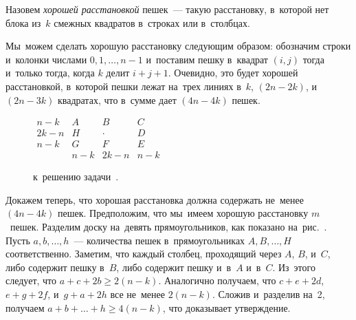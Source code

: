 \ifincludesolutions
Назовем \emph{хорошей расстановкой} пешек~--- такую расстановку, в~которой нет
блока из~$k$ смежных квадратов в~строках или в~столбцах.
\par
Мы~можем сделать хорошую расстановку следующим образом: обозначим строки
и~колонки числами $0, 1, \ldots, n - 1$ и~поставим пешку в~квадрат $(i, j)$
тогда и~только тогда, когда $k$ делит $i + j + 1$.
Очевидно, это будет хорошей расстановкой, в~которой пешки лежат на~трех линиях
в~$k$, $(2 n - 2 k)$, и~$(2 n - 3 k)$ квадратах, что в~сумме дает
$(4 n - 4 k)$ пешек.
\par
\begin{figure}[ht]\begin{center}
\(\begin{matrix}
    n - k    &    A    &     B     &    C    \\[2ex]
    2 k - n  &    H    &   \cdot   &    D    \\[2ex]
    n - k    &    G    &     F     &    E    \\[2ex]
             &  n - k  &  2 k - n  &  n - k
\end{matrix}\)
\caption{к~решению
    задачи~.}%
\end{center}\end{figure}
Докажем теперь, что хорошая расстановка должна содержать не~менее
$(4 n - 4 k)$ пешек.
Предположим, что мы~имеем хорошую расстановку $m$~пешек.
Разделим доску на~девять прямоугольников, как показано
на~рис.~.
Пусть $a, b, \ldots, h$~--- количества пешек в~прямоугольниках
$A, B, \ldots, H$ соответственно.
Заметим, что каждый столбец, проходящий через $A$, $B$, и~$C$, либо содержит
пешку в~$B$, либо содержит пешку и~в~$A$ и~в~$C$.
Из~этого следует, что $a + c + 2 b \geq 2 (n - k)$.
Аналогично получаем, что $c + e + 2 d$, $e + g + 2 f$, и~$g + a + 2 h$ все
не~менее $2 (n - k)$.
Сложив и~разделив на~2, получаем $a + b + \ldots + h \geq 4 (n - k)$, что
доказывает утверждение.
\fi %

\endgroup %

